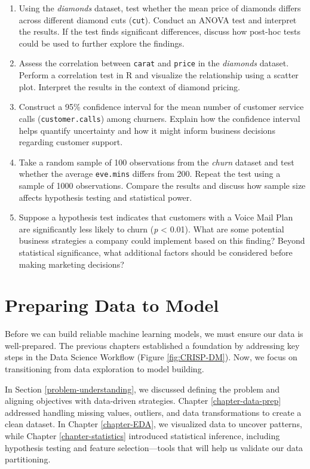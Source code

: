 \documentclass[
  11pt,
]{book}
\newcommand{\passthrough}[1]{#1}
\theoremstyle{definition}
\theoremstyle{definition}
\theoremstyle{definition}
\theoremstyle{definition}
\theoremstyle{remark}
\begin{document}
\begin{enumerate}
\item
  Using the \emph{diamonds} dataset, test whether the mean price of diamonds differs across different diamond cuts (\passthrough{\lstinline!cut!}). Conduct an ANOVA test and interpret the results. If the test finds significant differences, discuss how post-hoc tests could be used to further explore the findings.
\item
  Assess the correlation between \passthrough{\lstinline!carat!} and \passthrough{\lstinline!price!} in the \emph{diamonds} dataset. Perform a correlation test in R and visualize the relationship using a scatter plot. Interpret the results in the context of diamond pricing.
\item
  Construct a 95\% confidence interval for the mean number of customer service calls (\passthrough{\lstinline!customer.calls!}) among churners. Explain how the confidence interval helps quantify uncertainty and how it might inform business decisions regarding customer support.
\item
  Take a random sample of 100 observations from the \emph{churn} dataset and test whether the average \passthrough{\lstinline!eve.mins!} differs from 200. Repeat the test using a sample of 1000 observations. Compare the results and discuss how sample size affects hypothesis testing and statistical power.
\item
  Suppose a hypothesis test indicates that customers with a Voice Mail Plan are significantly less likely to churn (\emph{p} \textless{} 0.01). What are some potential business strategies a company could implement based on this finding? Beyond statistical significance, what additional factors should be considered before making marketing decisions?
\end{enumerate}

\chapter{Preparing Data to Model}\label{chapter-modeling}

Before we can build reliable machine learning models, we must ensure our data is well-prepared. The previous chapters established a foundation by addressing key steps in the Data Science Workflow (Figure \ref{fig:CRISP-DM}). Now, we focus on transitioning from data exploration to model building.

In Section \ref{problem-understanding}, we discussed defining the problem and aligning objectives with data-driven strategies. Chapter \ref{chapter-data-prep} addressed handling missing values, outliers, and data transformations to create a clean dataset. In Chapter \ref{chapter-EDA}, we visualized data to uncover patterns, while Chapter \ref{chapter-statistics} introduced statistical inference, including hypothesis testing and feature selection---tools that will help us validate our data partitioning.
\end{document}
